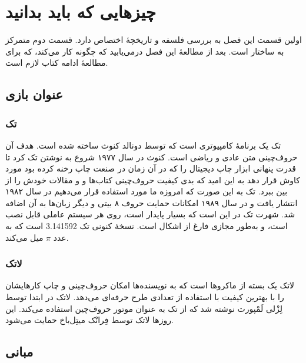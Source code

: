 \chapter{چیز‌هایی که باید بدانید}
\begin{intro}

اولین قسمت این فصل به بررسی فلسفه و تاریخچهٔ  
\lr{\LaTeXe}
 اختصاص دارد. قسمت دوم متمرکز به ساختار 
\lr{\LaTeXe}
 است. بعد از مطالعهٔ این فصل درمی‌یابید که 
\lr{\LaTeX} 
چگونه کار می‌کند، که برای مطالعهٔ ادامه کتاب لازم است.
\end{intro}
\section{عنوان بازی}
\subsection{تک}
تک یک برنامهٔ کامپیوتری است که توسط دونالد کنوث 
\cite{texbook}
 ساخته شده است. هدف آن حروف‌\-چینی متن عادی و ریاضی است.
کنوث در سال ۱۹۷۷ شروع به نوشتن تک کرد تا قدرت پنهانی ابزار چاپ دیجیتال را که در آن زمان در صنعت چاپ رخنه کرده بود مورد کاوش قرار دهد 
به این امید که بدی کیفیت حروف‌چینی کتاب‌ها و و مقالات خودش را از بین ببرد. تک به این صورت که امروزه ما مورد استفاده قرار می‌دهیم 
در سال ۱۹۸۲ انتشار یافت و در سال ۱۹۸۹ امکانات حمایت حروف ۸  بیتی و دیگر زبان‌ها به آن اضافه شد. شهرت تک در این است که بسیار پایدار است، 
روی هر سیستم‌ عاملی قابل نصب است، و به‌طور مجازی فارغ از اشکال است. نسخهٔ کنونی تک 3.141592 است که به عدد 
$\pi$
 میل می‌کند.
\subsection{لاتک}
لاتک یک بسته از ماکروها است که به نویسنده‌ها امکان حروف‌چینی و چاپ کارهایشان را با بهترین کیفیت با استفاده از تعدادی طرح حرفه‌ای می‌دهد. لاتک در ابتدا توسط لِزْلی لَمْپورت 
\cite{manual}
نوشته شد که از تک به عنوان موتور حروف‌چین استفاده می‌کند. این روزها لاتک توسط فِرانْک میتِل‌باخ 
حمایت می‌شود.

\section{مبانی}

